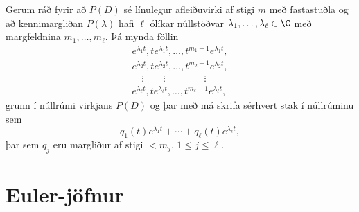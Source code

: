 \begin{se}
Gerum ráð fyrir að $P(D)$ sé línulegur afleiðuvirki af stigi $m$
með fasta\-stuðla og  að kennimargliðan $P(\lambda)$  hafi $\ell$ ólíkar
núllstöðvar  
$\lambda_1,\dots,\lambda_\ell\in \C$ með margfeldnina
$m_1,\dots,m_\ell$.  Þá mynda 
föllin
\begin{gather*}
e^{\lambda_1t}, te^{\lambda_1t},\dots, t^{m_1-1}e^{\lambda_1t},\\
e^{\lambda_2t}, te^{\lambda_2t},\dots, t^{m_2-1}e^{\lambda_2t},\\
\quad \vdots\qquad \vdots \qquad \qquad \vdots\\
e^{\lambda_\ell t}, te^{\lambda_\ell t},\dots, t^{m_\ell-1}e^{\lambda_\ell t},
\end{gather*}
grunn í núllrúmi virkjans $P(D)$ og þar með má skrifa 
sérhvert stak í núllrúminu sem 
$$
q_1(t)e^{\lambda_1t}+\cdots+q_\ell(t)e^{\lambda_\ell t},
$$
þar sem $q_j$ eru margliður af stigi $<m_j$, $1\leq j\leq \ell$.
\end{se}


 
\section{Euler-jöfnur}

